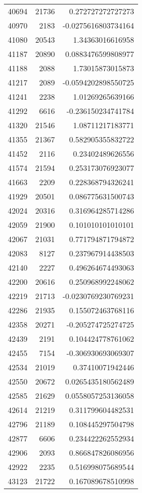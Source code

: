 \begin{tabular}{r | r | r}
40694 & 21736 & 0.272727272727273 \\
40970 & 2183 & -0.0275616803734164 \\
41080 & 20543 & 1.34363016616958 \\
41187 & 20890 & 0.0883476599808977 \\
41188 & 2088 & 1.73015873015873 \\
41217 & 2089 & -0.0594202898550725 \\
41241 & 2238 & 1.01269265639166 \\
41292 & 6616 & -0.236150234741784 \\
41320 & 21546 & 1.08711217183771 \\
41355 & 21367 & 0.582905355832722 \\
41452 & 2116 & 0.23402489626556 \\
41574 & 21594 & 0.253173076923077 \\
41663 & 2209 & 0.228368794326241 \\
41929 & 20501 & 0.086775631500743 \\
42024 & 20316 & 0.316964285714286 \\
42059 & 21900 & 0.101010101010101 \\
42067 & 21031 & 0.771794871794872 \\
42083 & 8127 & 0.237967914438503 \\
42140 & 2227 & 0.496264674493063 \\
42200 & 20616 & 0.250968992248062 \\
42219 & 21713 & -0.0230769230769231 \\
42286 & 21935 & 0.155072463768116 \\
42358 & 20271 & -0.205274725274725 \\
42439 & 2191 & 0.104424778761062 \\
42455 & 7154 & -0.306930693069307 \\
42534 & 21019 & 0.37410071942446 \\
42550 & 20672 & 0.0265435180562489 \\
42585 & 21629 & 0.0558057253136058 \\
42614 & 21219 & 0.311799604482531 \\
42796 & 21189 & 0.108445297504798 \\
42877 & 6606 & 0.234422262552934 \\
42906 & 2093 & 0.866847826086956 \\
42922 & 2235 & 0.516998075689544 \\
43123 & 21722 & 0.167089678510998 \\

\end{tabular}
